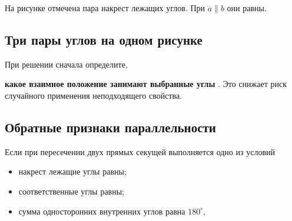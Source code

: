 \documentclass[a4paper,12pt]{article}
\newcommand{\key}[1]{
  \textcolor{darkaccent}{\textbf{#1}}
}
\begin{document}
На рисунке отмечена пара накрест лежащих углов.
При $a\parallel b$ они равны.

\subsection*{Три пары углов на одном рисунке}

\begin{center}


\end{center}

При решении сначала определите,
\key{какое взаимное положение занимают выбранные углы}.
Это снижает риск случайного применения неподходящего свойства.

\subsection*{Обратные признаки параллельности}

Если при пересечении двух прямых секущей выполняется одно из условий

\begin{itemize}

\item
накрест лежащие углы равны;

\item
соответственные углы равны;

\item
сумма односторонних внутренних углов
равна $180^\circ$,

\end{itemize}
\end{document}
